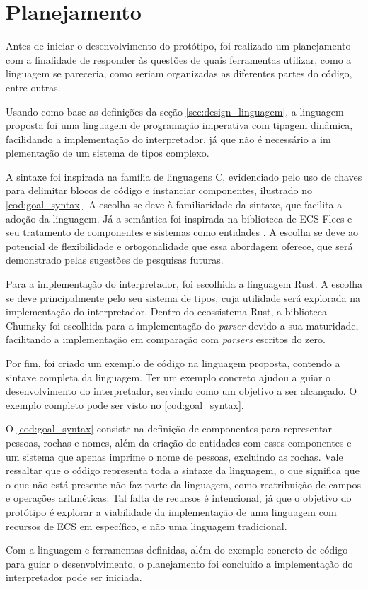 \section{Planejamento}

Antes de iniciar o desenvolvimento do protótipo, foi realizado um planejamento com a finalidade de responder às questões de quais ferramentas utilizar, como a linguagem se pareceria, como seriam organizadas as diferentes partes do código, entre outras.

Usando como base as definições da seção \ref{sec:design_linguagem}, a linguagem proposta foi uma linguagem de programação imperativa com tipagem dinâmica, facilidando a implementação do interpretador, já que não é necessário a im
plementação de um sistema de tipos complexo.

A sintaxe foi inspirada na família de linguagens C, evidenciado pelo uso de chaves para delimitar blocos de código e instanciar componentes, ilustrado no \autoref{cod:goal_syntax}. A escolha se deve à familiaridade da sintaxe, que facilita a adoção da linguagem. Já a semântica foi inspirada na biblioteca de ECS Flecs e seu tratamento de componentes e sistemas como entidades \cite{flecs}. A escolha se deve ao potencial de flexibilidade e ortogonalidade que essa abordagem oferece, que será demonstrado pelas sugestões de pesquisas futuras.

Para a implementação do interpretador, foi escolhida a linguagem Rust. A escolha se deve principalmente pelo seu sistema de tipos, cuja utilidade será explorada na implementação do interpretador. Dentro do ecossistema Rust, a biblioteca Chumsky foi escolhida para a implementação do \textit{parser} devido a sua maturidade, facilitando a implementação em comparação com \textit{parsers} escritos do zero.

Por fim, foi criado um exemplo de código na linguagem proposta, contendo a sintaxe completa da linguagem. Ter um exemplo concreto ajudou a guiar o desenvolvimento do interpretador, servindo como um objetivo a ser alcançado. O exemplo completo pode ser visto no \autoref{cod:goal_syntax}.

\codigoRust

\vspace{-1em}

O \autoref{cod:goal_syntax} consiste na definição de componentes para representar pessoas, rochas e nomes, além da criação de entidades com esses componentes e um sistema que apenas imprime o nome de pessoas, excluindo as rochas. Vale ressaltar que o código representa toda a sintaxe da linguagem, o que significa que o que não está presente não faz parte da linguagem, como reatribuição de campos e operações aritméticas. Tal falta de recursos é intencional, já que o objetivo do protótipo é explorar a viabilidade da implementação de uma linguagem com recursos de ECS em específico, e não uma linguagem tradicional.

Com a linguagem e ferramentas definidas, além do exemplo concreto de código para guiar o desenvolvimento, o planejamento foi concluído a implementação do interpretador pode ser iniciada.
